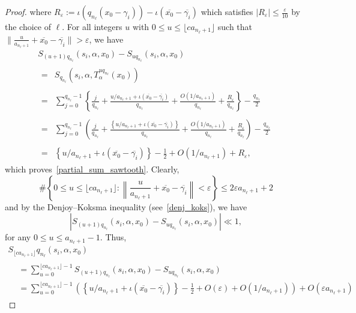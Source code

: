 \documentclass[AHL,Unicode,longabstracts,published]{cedram}
\newcommand{\kj}{n_{\ell}}
\begin{document}
\begin{proof}
where $ R_{\varepsilon} := \iota(q_{\kj}(x_0-\gamma_i)) - \iota(\overline{x_0}-\overline{\gamma_i})$ which satisfies $| R_{\varepsilon} | \leq \frac{\varepsilon}{10}$ by the choice of $\ell$. For all integers $u$ with $0 \leq u \leq \lfloor c a_{\kj +1} \rfloor $ such that $ \| \frac{u}{a_{\kj +1}} + \overline{x_0}-\overline{\gamma_i}\| > \varepsilon$, we have
\begin{multline*}
S_{(u+1)q_{\kj}}(s_i,\alpha,x_0) - S_{uq_{\kj}}(s_i,\alpha,x_0)
\\
\begin{aligned}
=&S_{q_{\kj}}\left(s_i, \alpha, T_{\alpha}^{u q_{\kj}}(x_0)\right) \\
\\=&\sum_{j = 0}^{q_{\kj}-1} \left\{ \frac{j}{q_{\kj}} +\frac{u/a_{\kj+1} + \iota \left(\overline{x_0} - \overline{\gamma_i}\right)}{q_{\kj}} + \frac{O(1/a_{\kj+1})}{q_{\kj}} + \frac{R_\varepsilon}{q_{\kj}}\right\} - \frac{q_{\kj}}{2} \\
\\=&\sum_{j = 0}^{q_{\kj}-1} \left(\frac{j}{q_{\kj}} +\frac{ \left \{u/a_{\kj+1} + \iota \left(\overline{x_0}- \overline{\gamma_i}\right) \right \}}{q_{\kj}} + \frac{O(1/a_{\kj+1})}{q_{\kj}} + \frac{R_\varepsilon}{q_{\kj}} \right) - \frac{q_{\kj}}{2}\\
\\=&\left\{u/a_{\kj+1} + \iota(\overline{x_0}- \overline{\gamma_i}) \right\} - \frac{1}{2} + O(1/a_{\kj+1}) + R_{\varepsilon},
\end{aligned}
\end{multline*}
which proves~\eqref{partial_sum_sawtooth}. Clearly,
\[
\#\left\{ 0 \leq u \leq \lfloor c a_{\kj+1}\rfloor:
\left\|\frac{u}{a_{\kj +1}} + \overline{x_0}- \overline{\gamma_i}\right\| < \varepsilon
\right\} \leq 2\varepsilon a_{\kj+1} + 2
\]
and by the Denjoy--Koksma inequality (see~\eqref{denj_koks}), we have
\[
| S_{(u+1)q_{\kj}}(s_i,\alpha,x_0) - S_{uq_{\kj}}(s_i,\alpha,x_0)|
\ll 1,
\]
for any $0 \leq u \leq {a_{\kj+1}-1}$. Thus,
\begin{multline*}
S_{\lfloor c a_{\kj+1}\rfloor}q_{\kj}(s_i,\alpha,x_0)
\\
\begin{aligned}
&= \sum_{u = 0}^{\lfloor c a_{\kj+1}\rfloor-1} S_{(u+1)q_{\kj}}(s_i,\alpha,x_0) - S_{uq_{\kj}}(s_i,\alpha,x_0)
\\&= \sum_{u = 0}^{\lfloor c a_{\kj+1}\rfloor-1}\left(\left\{u/a_{\kj+1} + \iota(\overline{x_0}- \overline{\gamma_i})\right\} - \frac{1}{2} + O(\varepsilon) + O\left(1/a_{\kj+1}\right)\right) + O\left(\varepsilon a_{\kj+1}\right)

\end{aligned}
\end{multline*}
\end{proof}
\end{document}
